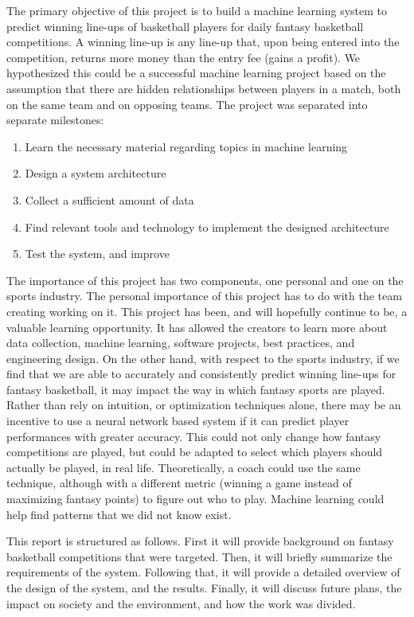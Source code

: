 
The primary objective of this project is to build a machine learning system to predict winning line-ups of basketball players for daily fantasy basketball competitions. A winning line-up is any line-up that, upon being entered into the competition, returns more money than the entry fee (gains a profit). We hypothesized this could be a successful machine learning project based on the assumption that there are hidden relationships between players in a match, both on the same team and on opposing teams. The project was separated into separate milestones:
\begin{enumerate}
\item{Learn the necessary material regarding topics in machine learning}
\item{Design a system architecture}
\item{Collect a sufficient amount of data}
\item{Find relevant tools and technology to implement the designed architecture}
\item{Test the system, and improve}
\end{enumerate}
The importance of this project has two components, one personal and one on the sports industry. The personal importance of this project has to do with the team creating working on it. This project has been, and will hopefully continue to be, a valuable learning opportunity. It has allowed the creators to learn more about data collection, machine learning, software projects, best practices, and engineering design. On the other hand, with respect to the sports industry, if we find that we are able to accurately and consistently predict winning line-ups for fantasy basketball, it may impact the way in which fantasy sports are played. Rather than rely on intuition, or optimization techniques alone, there may be an incentive to use a neural network based system if it can predict player performances with greater accuracy. This could not only change how fantasy competitions are played, but could be adapted to select which players should actually be played, in real life. Theoretically, a coach could use the same technique, although with a different metric (winning a game instead of maximizing fantasy points) to figure out who to play. Machine learning could help find patterns that we did not know exist.

This report is structured as follows. First it will provide background on fantasy basketball competitions that were targeted. Then, it will briefly summarize the requirements of the system. Following that, it will provide a detailed overview of the design of the system, and the results. Finally, it will discuss future plans, the impact on society and the environment, and how the work was divided.